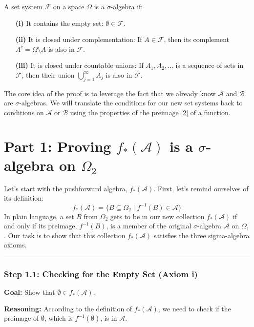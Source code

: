 \documentclass[11pt,a4paper]{article}
\begin{document}
A set system \(\mathcal{F}\) on a space \(\Omega\) is a \(\sigma\)-algebra if:
\begin{enumerate}
    \item[\textbf{(i)}] It contains the empty set: \(\emptyset \in \mathcal{F}\).
    \item[\textbf{(ii)}] It is closed under complementation: If \(A \in \mathcal{F}\), then its complement \(A^c = \Omega \setminus A\) is also in \(\mathcal{F}\).
    \item[\textbf{(iii)}] It is closed under countable unions: If \(A_1, A_2, \dots\) is a sequence of sets in \(\mathcal{F}\), then their union \(\bigcup_{j=1}^{\infty} A_j\) is also in \(\mathcal{F}\).
\end{enumerate}
The core idea of the proof is to leverage the fact that we already know \(\mathcal{A}\) and \(\mathcal{B}\) are \(\sigma\)-algebras. We will translate the conditions for our new set systems back to conditions on \(\mathcal{A}\) or \(\mathcal{B}\) using the properties of the preimage \hyperlink{def:preimage}{[2]} of a function.

\newpage
\section{Part 1: Proving \(f_*(\mathcal{A})\) is a \(\sigma\)-algebra on \(\Omega_2\)}

Let's start with the pushforward algebra, \(f_*(\mathcal{A})\).
First, let's remind ourselves of its definition:
\[ f_*(\mathcal{A}) = \{B \subseteq \Omega_2 \mid f^{-1}(B) \in \mathcal{A}\} \]
In plain language, a set \(B\) from \(\Omega_2\) gets to be in our new collection \(f_*(\mathcal{A})\) if and only if its preimage, \(f^{-1}(B)\), is a member of the original \(\sigma\)-algebra \(\mathcal{A}\) on \(\Omega_1\). Our task is to show that this collection \(f_*(\mathcal{A})\) satisfies the three sigma-algebra axioms.

\vspace{1em}
\hrule
\vspace{1em}

\subsubsection*{Step 1.1: Checking for the Empty Set (Axiom i)}
\textbf{Goal:} Show that \(\emptyset \in f_*(\mathcal{A})\).

\textbf{Reasoning:} According to the definition of \(f_*(\mathcal{A})\), we need to check if the preimage of \(\emptyset\), which is \(f^{-1}(\emptyset)\), is in \(\mathcal{A}\).
\end{document}
